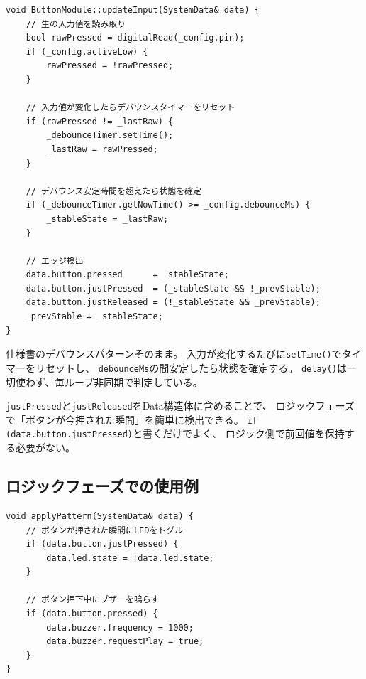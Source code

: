 \begin{lstlisting}[style=cppstyle, caption={ButtonModule.cpp — updateInput()}]
void ButtonModule::updateInput(SystemData& data) {
    // 生の入力値を読み取り
    bool rawPressed = digitalRead(_config.pin);
    if (_config.activeLow) {
        rawPressed = !rawPressed;
    }

    // 入力値が変化したらデバウンスタイマーをリセット
    if (rawPressed != _lastRaw) {
        _debounceTimer.setTime();
        _lastRaw = rawPressed;
    }

    // デバウンス安定時間を超えたら状態を確定
    if (_debounceTimer.getNowTime() >= _config.debounceMs) {
        _stableState = _lastRaw;
    }

    // エッジ検出
    data.button.pressed      = _stableState;
    data.button.justPressed  = (_stableState && !_prevStable);
    data.button.justReleased = (!_stableState && _prevStable);
    _prevStable = _stableState;
}
\end{lstlisting}

\begin{pointbox}[ModuleTimerによるデバウンス]
仕様書のデバウンスパターンそのまま。
入力が変化するたびに\texttt{setTime()}でタイマーをリセットし、
\texttt{debounceMs}の間安定したら状態を確定する。
\texttt{delay()}は一切使わず、毎ループ非同期で判定している。
\end{pointbox}

\begin{pointbox}[エッジ検出をData構造体に含める]
\texttt{justPressed}と\texttt{justReleased}をData構造体に含めることで、
ロジックフェーズで「ボタンが今押された瞬間」を簡単に検出できる。
\texttt{if (data.button.justPressed)}と書くだけでよく、
ロジック側で前回値を保持する必要がない。
\end{pointbox}

\subsection{ロジックフェーズでの使用例}

\begin{lstlisting}[style=cppstyle, caption={ロジックフェーズでのButtonData参照}]
void applyPattern(SystemData& data) {
    // ボタンが押された瞬間にLEDをトグル
    if (data.button.justPressed) {
        data.led.state = !data.led.state;
    }

    // ボタン押下中にブザーを鳴らす
    if (data.button.pressed) {
        data.buzzer.frequency = 1000;
        data.buzzer.requestPlay = true;
    }
}
\end{lstlisting}

